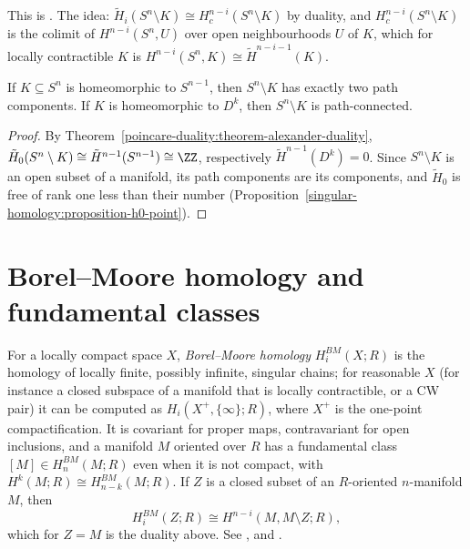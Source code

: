 This is \cite[Theorem 3.44]{hatcher-at}. The idea: $\tilde{H}_i(S^n \setminus K) \cong H^{n-i}_c(S^n \setminus K)$ by duality, and $H^{n-i}_c(S^n \setminus K)$ is the colimit of
$H^{n-i}(S^n, U)$ over open neighbourhoods $U$ of $K$, which for locally contractible $K$ is $H^{n-i}(S^n, K) \cong \tilde{H}^{n-i-1}(K)$.

\begin{corollary}\label{poincare-duality:corollary-jordan-brouwer}
If $K \subseteq S^n$ is homeomorphic to $S^{n-1}$, then $S^n \setminus K$ has exactly two path components. If $K$ is homeomorphic to $D^k$, then $S^n \setminus K$ is path-connected.
\end{corollary}

\begin{proof}
By Theorem~\ref{poincare-duality:theorem-alexander-duality}, $\tilde{H}_0(S^n \setminus K) \cong \tilde{H}^{n-1}(S^{n-1}) \cong \ZZ$, respectively $\tilde{H}^{n-1}(D^k) = 0$. Since $S^n \setminus K$ is
an open subset of a manifold, its path components are its components, and $\tilde{H}_0$ is free of rank one less than their number
(Proposition~\ref{singular-homology:proposition-h0-point}).
\end{proof}

\section{Borel--Moore homology and fundamental classes}\label{poincare-duality:section-borel-moore}

\begin{remark}\label{poincare-duality:remark-borel-moore}
For a locally compact space $X$, \emph{Borel--Moore homology} $H^{BM}_i(X; R)$ is the homology of locally finite, possibly infinite, singular chains; for reasonable $X$ (for
instance a closed subspace of a manifold that is locally contractible, or a CW pair) it can be computed as $H_i(X^+, \{\infty\}; R)$, where $X^+$ is the one-point
compactification. It is covariant for proper maps, contravariant for open inclusions, and a manifold $M$ oriented over $R$ has a fundamental class $[M] \in H^{BM}_n(M; R)$ even
when it is not compact, with $H^k(M; R) \cong H^{BM}_{n-k}(M; R)$. If $Z$ is a closed subset of an $R$-oriented $n$-manifold $M$, then
\[
H^{BM}_i(Z; R) \cong H^{n-i}(M, M \setminus Z; R),
\]
which for $Z = M$ is the duality above. See \cite[Chapter V]{bredon-sheaf}, \cite{iversen-sheaves} and \cite[Chapter 19]{fulton-intersection}.
\end{remark}

